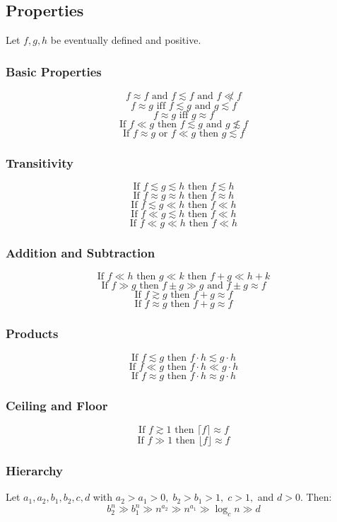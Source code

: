 \documentclass{article}
\begin{document}
\subsection{Properties}
Let $f,g,h$ be eventually defined and positive.

\subsubsection{Basic Properties}
\[
f\approx f\text{ and } f\lesssim f\text{ and } f\not\ll f
\]
\[
f\approx g\text{ iff }f\lesssim g\text{ and } g\lesssim f
\]
\[
f\approx g \text{ iff }g\approx f
\]
\[
\text{If }f\ll g\text{ then }f\lesssim g\text{ and }g\not\lesssim f
\]
\[
\text{If }f\approx g\text{ or }f\ll g\text{ then }g\lesssim f
\]


\subsubsection{Transitivity}
\[
\text{If }f\lesssim g\lesssim h\text{ then }f\lesssim h
\]
\[
\text{If }f\approx g\approx h\text{ then }f\approx h
\]
\[
\text{If }f\lesssim g\ll h\text{ then }f\ll h
\]
\[
\text{If }f\ll g\lesssim h\text{ then }f\ll h
\]
\[
\text{If }f\ll g\ll h\text{ then }f\ll h
\]

\subsubsection{Addition and Subtraction}
\[
\text{If }f\ll h\text{ then }g\ll k\text{ then }f+g\ll h+k
\]
\[
\text{If }f\gg g\text{ then }f\pm g\gg g\text{ and }f\pm g\approx f
\]
\[
\text{If }f\gtrsim g\text{ then }f+ g\approx f
\]
\[
\text{If }f\approx g\text{ then }f+ g\approx f
\]

\subsubsection{Products}
\[
\text{If }f\lesssim g\text{ then }f\cdot h\lesssim g\cdot h
\]
\[
\text{If }f\ll g\text{ then }f\cdot h\ll g\cdot h
\]
\[
\text{If }f\approx g\text{ then }f\cdot h\approx g\cdot h
\]

\subsubsection{Ceiling and Floor}
\[
\text{If }f\gtrsim 1\text{ then }\lceil f\rceil \approx f
\]
\[
\text{If }f\gg 1\text{ then }\lfloor f\rfloor \approx f
\]

\subsubsection{Hierarchy}
Let $a_1, a_2, b_1, b_2, c, d$  with 
$a_2 > a_1 > 0,\; b_2 > b_1 > 1,\; c > 1,$ and $d>0$. Then:
\[
b_2^n \gg b_1^n \gg n^{a_2} \gg n^{a_1} \gg \log_c n \gg d
\]
\end{document}
